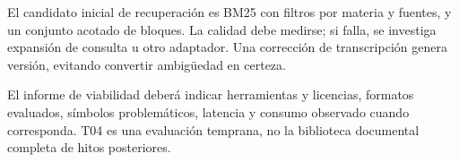El candidato inicial de recuperación es BM25 con filtros por materia y fuentes, y un conjunto acotado de bloques. La calidad debe medirse; si falla, se investiga expansión de consulta u otro adaptador. Una corrección de transcripción genera versión, evitando convertir ambigüedad en certeza.


El informe de viabilidad deberá indicar herramientas y licencias, formatos evaluados, símbolos problemáticos, latencia y consumo observado cuando corresponda. T04 es una evaluación temprana, no la biblioteca documental completa de hitos posteriores.
